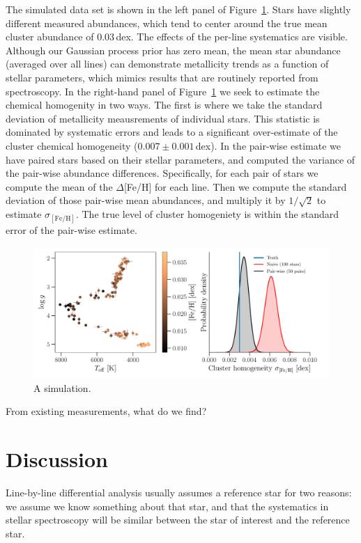 \documentclass[modern]{aastex631}
\newcommand{\todo}[1]{\textcolor{tab:red}{#1}}
\begin{document}
The simulated data set is shown in the left panel of Figure~\ref{fig:simulation}. Stars have slightly different measured abundances, which tend to center around the true mean cluster abundance of 0.03\,dex. The effects of the per-line systematics are visible. Although our Gaussian process prior has zero mean, the mean star abundance (averaged over all lines) can demonstrate metallicity trends as a function of stellar parameters, which mimics results that are routinely reported from spectroscopy. In the right-hand panel of Figure~\ref{fig:simulation} we seek to estimate the chemical homogenity in two ways. The first is where we take the standard deviation of metallicity meausrements of individual stars. This statistic is dominated by systematic errors and leads to a significant over-estimate of the cluster chemical homogeneity ($0.007 \pm 0.001$\,dex). In the pair-wise estimate we have paired stars based on their stellar parameters, and computed the variance of the pair-wise abundance differences. Specifically, for each pair of stars we compute the mean of the $\Delta$[Fe/H] for each line. Then we compute the standard deviation of those pair-wise mean abundances, and multiply it by $1/\sqrt{2}$ to estimate $\sigma_{\mathrm{[Fe/H]}}$. The true level of cluster homogeniety is within the standard error of the pair-wise estimate.\\


\begin{figure}
    \includegraphics*[width=\textwidth]{simulation.pdf}
    \caption{A simulation.\label{fig:simulation}}
\end{figure}

\todo{From existing measurements, what do we find?}

\section{Discussion}

\todo{Line-by-line differential analysis usually assumes a reference star for two reasons: we assume we know something about  that star, and that the systematics in stellar spectroscopy will be similar between the star of interest and the reference star.}
\end{document}
